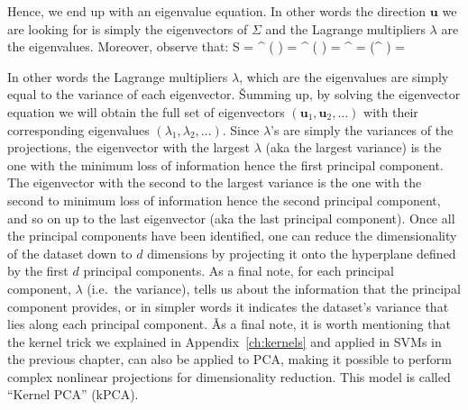 \vspace{-15pt}

Hence, we end up with an eigenvalue equation. In other words the direction $\boldsymbol{u}$ we are looking for is
simply the eigenvectors of $\Sigma$ and the Lagrange multipliers $\lambda$ are the eigenvalues. Moreover, observe that:
\bse
S = ^{\intercal} \left( \Sigma {} \right) =
^{\intercal} \left( \lambda {} \right) = 
^{\intercal} \lambda {} = 
\lambda \left(^{\intercal}  \right) = \lambda
\ese

In other words the Lagrange multipliers $\lambda$, which are the eigenvalues are simply equal to the variance of 
each eigenvector. \v

Summing up, by solving the eigenvector equation we will obtain the full set of eigenvectors $(\boldsymbol{u}_1, 
\boldsymbol{u}_2, \ldots)$ with their corresponding eigenvalues $(\lambda_1, \lambda_2, \ldots)$. Since $\lambda$'s 
are simply the variances of the projections, the eigenvector with the largest $\lambda$ (aka the largest variance) is
the one with the minimum loss of information hence the first principal component. The eigenvector with the second to
the largest variance is the one with the second to minimum loss of information hence the second principal component, 
and so on up to the last eigenvector (aka the last principal component). Once all the principal components have been 
identified, one can reduce the dimensionality of the dataset down to $d$ dimensions by projecting it onto the 
hyperplane defined by the first $d$ principal components. As a final note, for each principal component, $\lambda$
(i.e.\ the variance), tells us about the information that the principal component provides, or in simpler words it
indicates the dataset's variance that lies along each principal component. \v

As a final note, it is worth mentioning that the kernel trick we explained in Appendix~\ref{ch:kernels} and applied 
in SVMs in the previous chapter, can also be applied to PCA, making it possible to perform complex nonlinear 
projections for dimensionality reduction. This model is called ``Kernel PCA'' (kPCA).

